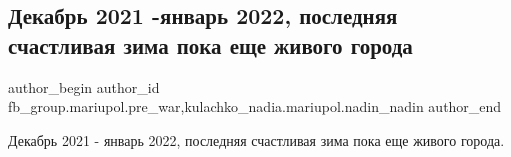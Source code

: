  
 
 
 
 

\subsection{Декабрь 2021 -январь 2022, последняя счастливая зима пока еще живого города}
\label{sec:09_01_2023.fb.fb_group.mariupol.pre_war.1.dekabr_2021__yanvar_}
 
\ifcmt
 author_begin
   author_id fb_group.mariupol.pre_war,kulachko_nadia.mariupol.nadin_nadin
 author_end
\fi

Декабрь 2021 - январь 2022, последняя счастливая зима пока еще живого города.
